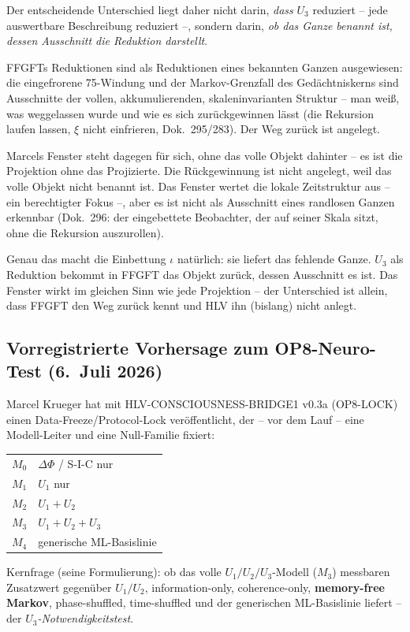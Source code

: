 Der entscheidende Unterschied liegt daher nicht darin, \emph{dass} $U_3$
reduziert -- jede auswertbare Beschreibung reduziert --, sondern darin,
\emph{ob das Ganze benannt ist, dessen Ausschnitt die Reduktion darstellt}.

FFGFTs Reduktionen sind als Reduktionen eines bekannten Ganzen
ausgewiesen: die eingefrorene 75-Windung und der Markov-Grenzfall des
Gedächtniskerns sind Ausschnitte der vollen, akkumulierenden,
skaleninvarianten Struktur -- man weiß, was weggelassen wurde und wie es
sich zurückgewinnen lässt (die Rekursion laufen lassen, $\xi$ nicht
einfrieren, Dok.~295/283). Der Weg zurück ist angelegt.

Marcels Fenster steht dagegen für sich, ohne das volle Objekt dahinter --
es ist die Projektion ohne das Projizierte. Die Rückgewinnung ist nicht
angelegt, weil das volle Objekt nicht benannt ist. Das Fenster wertet die
lokale Zeitstruktur aus -- ein berechtigter Fokus --, aber es ist nicht als
Ausschnitt eines randlosen Ganzen erkennbar (Dok.~296: der eingebettete
Beobachter, der auf seiner Skala sitzt, ohne die Rekursion auszurollen).

Genau das macht die Einbettung $\iota$ natürlich: sie liefert das fehlende
Ganze. $U_3$ als Reduktion bekommt in FFGFT das Objekt zurück, dessen
Ausschnitt es ist. Das Fenster wirkt im gleichen Sinn wie jede Projektion
-- der Unterschied ist allein, dass FFGFT den Weg zurück kennt und HLV
ihn (bislang) nicht anlegt.

\subsection*{Vorregistrierte Vorhersage zum OP8-Neuro-Test (6.~Juli 2026)}

Marcel Krueger hat mit HLV-CONSCIOUSNESS-BRIDGE1 v0.3a (OP8-LOCK) einen
Data-Freeze/Protocol-Lock veröffentlicht, der -- vor dem Lauf -- eine
Modell-Leiter und eine Null-Familie fixiert:
\begin{center}
\begin{tabular}{ll}
$M_0$ & $\Delta\Phi$ / S-I-C nur \\
$M_1$ & $U_1$ nur \\
$M_2$ & $U_1 + U_2$ \\
$M_3$ & $U_1 + U_2 + U_3$ \\
$M_4$ & generische ML-Basislinie
\end{tabular}
\end{center}
Kernfrage (seine Formulierung): ob das volle $U_1/U_2/U_3$-Modell ($M_3$)
messbaren Zusatzwert gegenüber $U_1/U_2$, information-only, coherence-only,
\textbf{memory-free Markov}, phase-shuffled, time-shuffled und der
generischen ML-Basislinie liefert -- der \emph{$U_3$-Notwendigkeitstest}.

